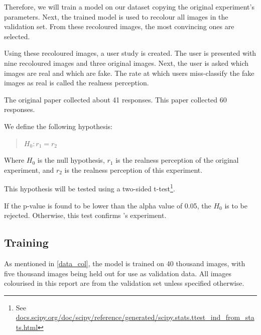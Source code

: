 \documentclass{article}
\begin{document}
    Therefore, we will train a model on our dataset copying the original experiment's parameters. Next, the trained model is used to recolour all images in the validation set. From these recoloured images, the most convincing ones are selected.
    
    Using these recoloured images, a user study is created. The user is presented with nine recoloured images and three original images. Next, the user is asked which images are real and which are fake. The rate at which users miss-classify the fake images as real is called the realness perception.
    
    The original paper collected about 41 responses. This paper collected 60 responses.
    
    
    
    We define the following hypothesis:
    \begin{quote}
        $H_{0}: r_{1} = r_{2}$
    \end{quote}
    Where $H_{0}$ is the null hypothesis, $r_{1}$ is the realness perception of the original experiment, and $r_{2}$ is the realness perception of this experiment.
    
    This hypothesis will be tested using a two-sided t-test\footnote{See \href{https://docs.scipy.org/doc/scipy/reference/generated/scipy.stats.ttest\_ind\_from\_stats.html\#r24a95fcea38c-1}{docs.scipy.org/doc/scipy/reference/generated/scipy.stats.ttest\_ind\_from\_stats.html}}.
    
    If the p-value is found to be lower than the alpha value of 0.05, the $H_{0}$ is to be rejected. Otherwise, this test confirms \cite{deepkoal2017}'s experiment.
    
    
    
    \subsection{Training}
        As mentioned in \ref{data_col}, the model is trained on 40 thousand images, with five thousand images being held out for use as validation data. All images colourised in this report are from the validation set unless specified otherwise. 
        
\end{document}
